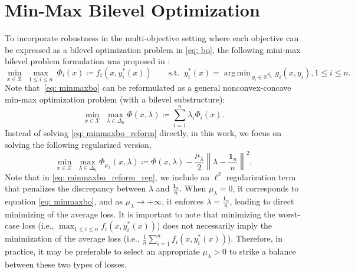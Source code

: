 \documentclass[10pt]{article}
\newtheorem{definition}{Definition}
\theoremstyle{remark}
\newcommand{\cX}{\mathcal{X}}
\newcommand{\realset}{\mathbb{R}}
\newcommand{\E}{\mathbb{E}}
\newcommand{\norm}[1]{\left\|#1\right\|}
\newcommand{\bfone}{\mathbf{1}}
\DeclareMathOperator*{\argmax}{arg\,max\,}
\DeclareMathOperator*{\argmin}{arg\,min\,}
\begin{document}
\section{Min-Max Bilevel Optimization}

To incorporate robustness in the multi-objective setting where each objective can be expressed as a bilevel optimization problem in \eqref{eq: bo}, the following mini-max bilevel problem formulation was proposed in \cite{gu2022min}:
\begin{equation}\label{eq: minmaxbo}
        \min_{x\in \cX}\ \max_{1\leq i \leq n } \ \Phi_i(x) \coloneqq f_i(x, y_i^*(x)) \qquad \text{s.t. }\ y_i^*(x) = \argmin_{y_i\in \realset^{d_{y_i}}} g_i(x, y_i), 1\leq i\leq n.
\end{equation}
Note that~\eqref{eq: minmaxbo} can be reformulated as a general nonconvex-concave min-max optimization problem (with a bilevel substructure):
\begin{equation}\label{eq: minmaxbo_reform}
        \min_{x\in \cX}\ \max_{\lambda\in \Delta_n}\Phi(x,\lambda) \coloneqq \sum_{i=1}^{n}\lambda_i \Phi_i(x).
\end{equation}
Instead of solving \eqref{eq: minmaxbo_reform} directly, in this work, we focus on solving the following regularized version,
\begin{equation}\label{eq: minmaxbo_reform_reg}
        \min_{x\in \cX}\ \max_{\lambda\in \Delta_n}\Phi_{\mu_{\lambda}}(x,\lambda) \coloneqq \Phi(x,\lambda) - \frac{\mu_{\lambda}}{2}\norm{\lambda - \frac{\bfone_n}{n}}^2.
\end{equation}
Note that in \eqref{eq: minmaxbo_reform_reg}, we include an $\ell^2$ regularization term that penalizes the discrepancy between $\lambda$ and $\frac{\bfone_n}{n}$. When $\mu_{\lambda} = 0$, it corresponds to equation \eqref{eq: minmaxbo}, and as $\mu_{\lambda}\rightarrow +\infty$, it enforces $\lambda = \frac{\bfone_n}{n}$, leading to direct minimizing of the average loss. It is important to note that minimizing the worst-case loss (i.e., $\max_{1\leq i\leq n}f_i(x,y_i^*(x))$) does not necessarily imply the minimization of the average loss (i.e., $\frac{1}{n}\sum_{i=1}^{n}f_i(x, y_i^*(x))$). Therefore, in practice, it may be preferable to select an appropriate $\mu_{\lambda}>0$ \cite{qian2019robust, wang2021adversarial} to strike a balance between these two types of losses.
\end{document}
